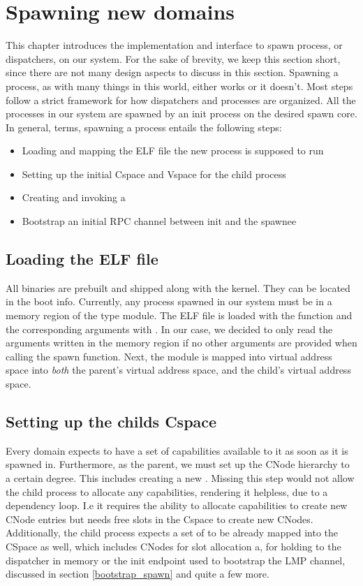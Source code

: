 
\section{Spawning new domains}

This chapter introduces the implementation and interface to spawn process, or dispatchers, on our system. For the sake of brevity, we keep this section short, since there are not many design aspects to discuss in this section. Spawning a process, as with many things in this world, either works or it doesn't. Most steps follow a strict framework for how dispatchers and processes are organized. All the processes in our system are spawned by an init process on the desired spawn core. In general, terms, spawning a process entails the following steps:
\begin{itemize}
    \item Loading and mapping the ELF file the new process is supposed to run
    \item Setting up the initial Cspace and Vspace for the child process
    \item Creating and invoking a 
    \item Bootstrap an initial RPC channel between init and the spawnee
\end{itemize}

\subsection{Loading the ELF file}

All binaries are prebuilt and shipped along with the kernel. They can be located in the boot info. Currently, any process spawned in our system must be in a memory region of the type module. The ELF file is loaded with the  function and the corresponding arguments with . In our case, we decided to only read the arguments written in the memory region if no other arguments are provided when calling the spawn function. Next, the module is mapped into virtual address space into \textit{both} the parent's virtual address space, and the child's virtual address space.

\subsection{Setting up the childs Cspace}
Every domain expects to have a set of capabilities available to it as soon as it is spawned in. Furthermore, as the parent, we must set up the CNode hierarchy to a certain degree. This includes creating a new . Missing this step would not allow the child process to allocate any capabilities, rendering it helpless, due to a dependency loop. I.e it requires the ability to allocate capabilities to create new CNode entries but needs free slots in the Cspace to create new CNodes. Additionally, the child process expects a set of  to be already mapped into the CSpace as well, which includes CNodes for slot allocation a,  for holding to the dispatcher in memory or the init endpoint used to bootstrap the LMP channel, discussed in section \ref{bootstrap_spawn} and quite a few more. 

